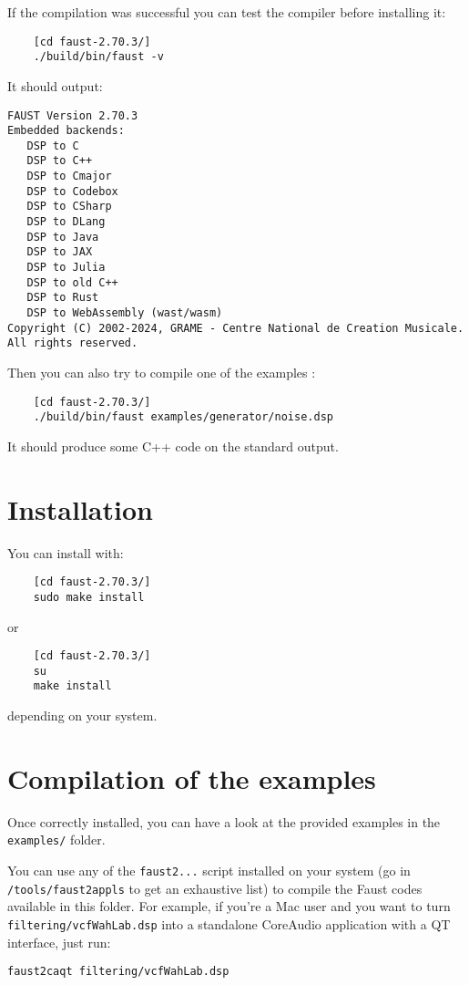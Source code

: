 If the compilation was successful you can test the compiler before installing it:
\begin{lstlisting}
	[cd faust-2.70.3/]
	./build/bin/faust -v
\end{lstlisting}
It should output:
\begin{lstlisting}
FAUST Version 2.70.3
Embedded backends: 
   DSP to C
   DSP to C++
   DSP to Cmajor
   DSP to Codebox
   DSP to CSharp
   DSP to DLang
   DSP to Java
   DSP to JAX
   DSP to Julia
   DSP to old C++
   DSP to Rust
   DSP to WebAssembly (wast/wasm)
Copyright (C) 2002-2024, GRAME - Centre National de Creation Musicale. All rights reserved. 
\end{lstlisting}

Then you can also try to compile one of the examples :
\begin{lstlisting}
	[cd faust-2.70.3/]
	./build/bin/faust examples/generator/noise.dsp
\end{lstlisting}
It should produce some C++ code on the standard output.

\section{Installation}
You can install \faust with:
\begin{lstlisting}
	[cd faust-2.70.3/]
	sudo make install
\end{lstlisting}
or
\begin{lstlisting}
	[cd faust-2.70.3/]
	su
	make install
\end{lstlisting}
depending on your system.

\section{Compilation of the examples}

Once \faust correctly installed, you can have a look at the provided examples in the \lstinline'examples/' folder. 

You can use any of the \lstinline'faust2...' script installed on your system (go in \lstinline'/tools/faust2appls' to get an exhaustive list) to compile the Faust codes available in this folder. For example, if you're a Mac user and you want to turn \lstinline'filtering/vcfWahLab.dsp' into a standalone CoreAudio application with a QT interface, just run:

\lstinline'faust2caqt filtering/vcfWahLab.dsp'

